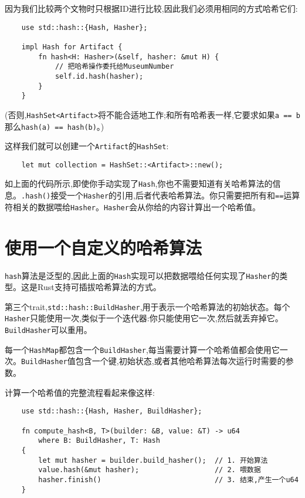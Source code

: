 因为我们比较两个文物时只根据ID进行比较,因此我们必须用相同的方式哈希它们:
\begin{verbatim}
    use std::hash::{Hash, Hasher};

    impl Hash for Artifact {
        fn hash<H: Hasher>(&self, hasher: &mut H) {
            // 把哈希操作委托给MuseumNumber
            self.id.hash(hasher);
        }
    }
\end{verbatim}
(否则,\texttt{HashSet<Artifact>}将不能合适地工作;和所有哈希表一样,它要求如果\texttt{a == b}那么\texttt{hash(a) == hash(b)}。)

这样我们就可以创建一个\texttt{Artifact}的\texttt{HashSet}:
\begin{verbatim}
    let mut collection = HashSet::<Artifact>::new();
\end{verbatim}

如上面的代码所示,即使你手动实现了\texttt{Hash},你也不需要知道有关哈希算法的信息。\texttt{.hash()}接受一个\texttt{Hasher}的引用,后者代表哈希算法。你只需要把所有和\texttt{==}运算符相关的数据喂给\texttt{Hasher}。\texttt{Hasher}会从你给的内容计算出一个哈希值。

\section{使用一个自定义的哈希算法}

\texttt{hash}算法是泛型的,因此上面的\texttt{Hash}实现可以把数据喂给任何实现了\texttt{Hasher}的类型。这是Rust支持可插拔哈希算法的方式。

第三个trait,\texttt{std::hash::BuildHasher},用于表示一个哈希算法的初始状态。每个\texttt{Hasher}只能使用一次,类似于一个迭代器:你只能使用它一次,然后就丢弃掉它。\texttt{BuildHasher}可以重用。

每一个\texttt{HashMap}都包含一个\texttt{BuildHasher},每当需要计算一个哈希值都会使用它一次。\texttt{BuildHasher}值包含一个键,初始状态,或者其他哈希算法每次运行时需要的参数。

计算一个哈希值的完整流程看起来像这样:
\begin{verbatim}
    use std::hash::{Hash, Hasher, BuildHasher};

    fn compute_hash<B, T>(builder: &B, value: &T) -> u64
        where B: BuildHasher, T: Hash
    {
        let mut hasher = builder.build_hasher();  // 1. 开始算法
        value.hash(&mut hasher);                  // 2. 喂数据
        hasher.finish()                           // 3. 结束,产生一个u64
    }
\end{verbatim}

